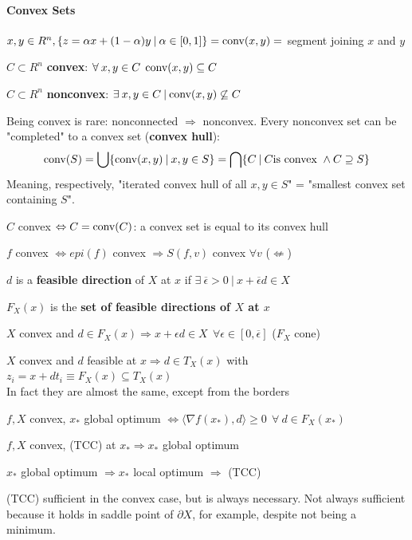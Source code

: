 \documentclass[10pt]{report}
\begin{document}
\paragraph{Convex Sets} $x,y\in R^n,\{z=\alpha x+(1-\alpha)y\:|\:\alpha\in[0,1]\} = \hbox{conv}(x,y) =$ segment joining $x$ and $y$
\begin{list}{}{}
	\item $C\subset R^n$ \textbf{convex}: $\forall\:x,y\in C\:\:\hbox{conv}(x,y)\subseteq C$
	\item $C\subset R^n$ \textbf{nonconvex}: $\exists\:x,y\in C\:|\:\hbox{conv}(x,y)\not\subseteq C$
\end{list}
Being convex is rare: nonconnected $\Rightarrow$ nonconvex. Every nonconvex set can be "completed" to a convex set (\textbf{convex hull}):
$$\hbox{conv}(S) = \bigcup\{\hbox{conv}(x,y)\:|\:x,y\in S\} = \bigcap\{C\:|\:C\hbox{is convex }\wedge C\supseteq S\}$$
Meaning, respectively, "iterated convex hull of all $x,y\in S$" = "smallest convex set containing $S$".\begin{list}{}{}
	\item $C$ convex $\Leftrightarrow C = \hbox{conv}(C)$: a convex set is equal to its convex hull
	\item $f$ convex $\Leftrightarrow epi(f)$ convex $\Rightarrow S(f,v)$ convex $\forall v$ ($\not\Leftarrow$)
	\item $d$ is a \textbf{feasible direction} of $X$ at $x$ if $\exists\:\overline{\epsilon}>0\:|\:x+\overline{\epsilon}d \in X$
	\item $F_X(x)$ is the \textbf{set of feasible directions of $X$ at $x$}
	\item $X$ convex and $d\in F_X(x)\Rightarrow x+\epsilon d\in X\:\:\forall
	\epsilon\in [0,\overline{\epsilon}]$ ($F_X$ cone)
	\item $X$ convex and $d$ feasible at $x \Rightarrow d\in T_X(x)$ with $z_i = x + dt_i \equiv F_X(x)\subseteq T_X(x)$\\
	In fact they are almost the same, except from the borders
	\item $f,X$ convex, $x_*$ global optimum $\Leftrightarrow\langle\nabla f(x_*),d\rangle \geq 0\:\:\forall\:d\in F_X(x_*)$
	\item $f,X$ convex, (TCC) at $x_*\Rightarrow x_*$ global optimum
	\item $x_*$ global optimum $\Rightarrow x_*$ local optimum $\Rightarrow$ (TCC)
\end{list}
(TCC) sufficient in the convex case, but is always necessary. Not always sufficient because it holds in saddle point of $\partial X$, for example, despite not being a minimum.\\
\end{document}
